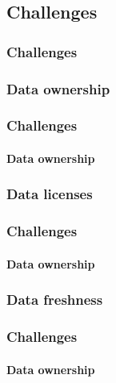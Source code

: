 \documentclass{beamer}
\begin{document}
\subsection{Challenges}
\begin{frame}
\frametitle{Challenges}
\end{frame}

\subsubsection{Data ownership}
\begin{frame}
\frametitle{Challenges}
\framesubtitle{Data ownership}
\end{frame}

\subsubsection{Data licenses}
\begin{frame}
\frametitle{Challenges}
\framesubtitle{Data ownership}
\end{frame}

\subsubsection{Data freshness}
\begin{frame}
\frametitle{Challenges}
\framesubtitle{Data ownership}
\end{frame}
\end{document}
